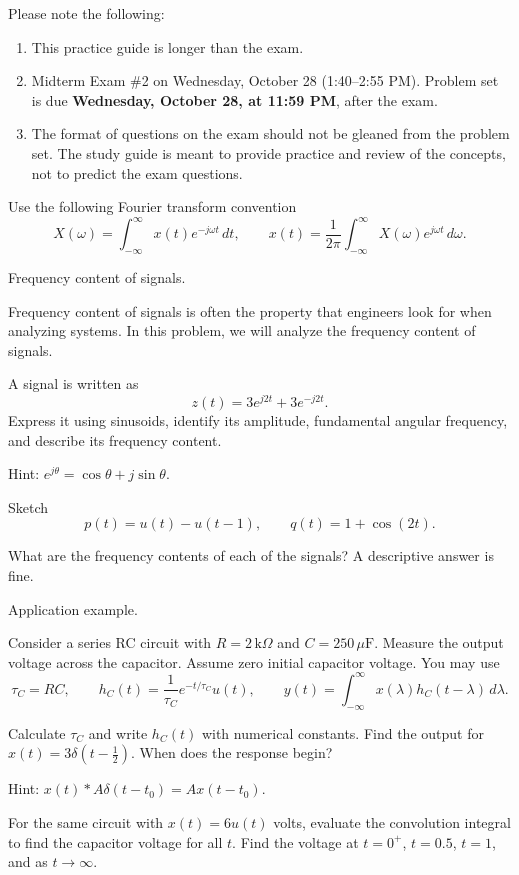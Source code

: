 \documentclass{ee102_pset}
\author{\rule{3cm}{0.4pt}}
\begin{document}
Please note the following:
\begin{enumerate}
    \item This practice guide is longer than the exam.
    \item Midterm Exam \#2 on Wednesday, October 28 (1:40--2:55 PM). Problem set is due \textbf{Wednesday, October 28, at 11:59 PM}, after the exam.
    \item The format of questions on the exam should not be gleaned from the problem set. The study guide is meant to provide practice and review of the concepts, not to predict the exam questions.
\end{enumerate}
Use the following Fourier transform convention
\[
X(\omega)=\int_{-\infty}^{\infty}x(t)e^{-j\omega t}\,dt,
\qquad
x(t)=\frac{1}{2\pi}\int_{-\infty}^{\infty}X(\omega)e^{j\omega t}\,d\omega.
\]

 Frequency content of signals. 

Frequency content of signals is often the property that engineers look for when analyzing systems. In this problem, we will analyze the frequency content of signals.

\problempart[5 points] A signal is written as
\[
z(t)=3e^{j2t}+3e^{-j2t}.
\]
Express it using sinusoids, identify its amplitude, fundamental angular frequency, and describe its frequency content.

Hint: $e^{j\theta} = \cos\theta + j\sin\theta$.

\problempart[5 points] Sketch
\[
p(t)=u(t)-u(t-1),\qquad q(t)=1+\cos(2t).
\]

What are the frequency contents of each of the signals? A descriptive answer is fine.

 Application example.

Consider a series RC circuit with $R=2\,\mathrm{k}\Omega$ and
$C=250\,\mu\mathrm F$. Measure the output voltage across the capacitor.
Assume zero initial capacitor voltage. You may use
\[
\tau_C=RC,\qquad h_C(t)=\frac{1}{\tau_C}e^{-t/\tau_C}u(t),
\qquad
y(t)=\int_{-\infty}^{\infty}x(\lambda)h_C(t-\lambda)\,d\lambda.
\]

\problempart[5 points] Calculate $\tau_C$ and write $h_C(t)$ with numerical
constants. Find the output for $x(t)=3\delta(t-\tfrac12)$.
When does the response begin?

Hint: $x(t)*A\delta(t-t_0)=A x(t-t_0)$.

\problempart[10 points] For the same circuit with $x(t)=6u(t)$ volts, evaluate
the convolution integral to find the capacitor voltage for all $t$.
Find the voltage at $t=0^+$, $t=0.5$, $t=1$, and as $t\to\infty$.
\end{document}
